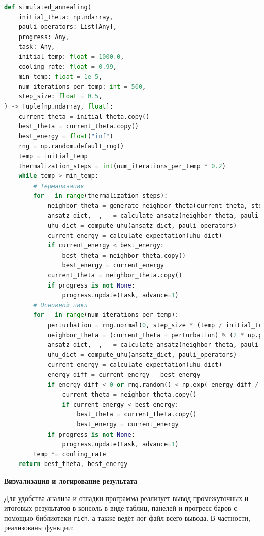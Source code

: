 \documentclass[a4paper]{report}
\begin{document}
\begin{lstlisting}[language=Python]
def simulated_annealing(
    initial_theta: np.ndarray,
    pauli_operators: List[Any],
    progress: Any,
    task: Any,
    initial_temp: float = 1000.0,
    cooling_rate: float = 0.99,
    min_temp: float = 1e-5,
    num_iterations_per_temp: int = 500,
    step_size: float = 0.5,
) -> Tuple[np.ndarray, float]:
    current_theta = initial_theta.copy()
    best_theta = current_theta.copy()
    best_energy = float("inf")
    rng = np.random.default_rng()
    temp = initial_temp
    thermalization_steps = int(num_iterations_per_temp * 0.2)
    while temp > min_temp:
        # Термализация
        for _ in range(thermalization_steps):
            neighbor_theta = generate_neighbor_theta(current_theta, step_size)
            ansatz_dict, _, _ = calculate_ansatz(neighbor_theta, pauli_operators)
            uhu_dict = compute_uhu(ansatz_dict, pauli_operators)
            current_energy = calculate_expectation(uhu_dict)
            if current_energy < best_energy:
                best_theta = neighbor_theta.copy()
                best_energy = current_energy
            current_theta = neighbor_theta.copy()
            if progress is not None:
                progress.update(task, advance=1)
        # Основной цикл
        for _ in range(num_iterations_per_temp):
            perturbation = rng.normal(0, step_size * (temp / initial_temp), current_theta.shape)
            neighbor_theta = (current_theta + perturbation) % (2 * np.pi)
            ansatz_dict, _, _ = calculate_ansatz(neighbor_theta, pauli_operators)
            uhu_dict = compute_uhu(ansatz_dict, pauli_operators)
            current_energy = calculate_expectation(uhu_dict)
            energy_diff = current_energy - best_energy
            if energy_diff < 0 or rng.random() < np.exp(-energy_diff / temp):
                current_theta = neighbor_theta.copy()
                if current_energy < best_energy:
                    best_theta = current_theta.copy()
                    best_energy = current_energy
            if progress is not None:
                progress.update(task, advance=1)
        temp *= cooling_rate
    return best_theta, best_energy
\end{lstlisting}

\noindent
\textbf{Визуализация и логирование результата}

Для удобства анализа и отладки программа реализует вывод промежуточных и итоговых результатов в консоль в виде таблиц, панелей и прогресс-баров с помощью библиотеки \texttt{rich}, а также ведёт лог-файл всего вывода. В частности, реализованы функции:
\end{document}
